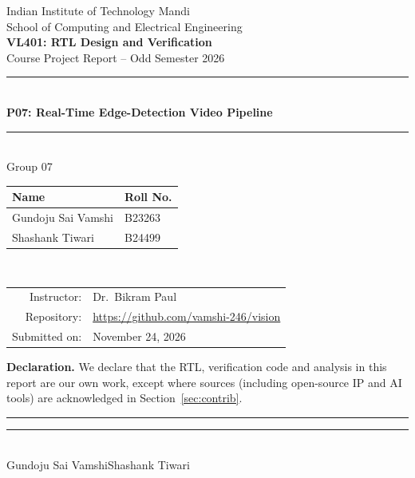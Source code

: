 \documentclass[11pt,a4paper]{article}
\newcommand{\groupno}{07}
\newcommand{\projno}{P07}
\newcommand{\projtitle}{Real-Time Edge-Detection Video Pipeline}
\newcommand{\studentA}{Gundoju Sai Vamshi}
\newcommand{\rollA}{B23263}
\newcommand{\studentB}{Shashank Tiwari}
\newcommand{\rollB}{B24499}
\newcommand{\repourl}{https://github.com/vamshi-246/vision}
\newcommand{\submitdate}{November 24, 2026}
\begin{document}
\begin{titlepage}
\centering
{\large Indian Institute of Technology Mandi}\\[2pt]
{\normalsize School of Computing and Electrical Engineering}\\[1.6cm]
{\Large\bfseries VL401: RTL Design and Verification}\\[4pt]
{\large Course Project Report -- Odd Semester 2026}\\[1.6cm]
{\color{iitblue}\rule{\linewidth}{1pt}}\\[8pt]
{\LARGE\bfseries \projno: \projtitle}\\[8pt]
{\color{iitblue}\rule{\linewidth}{1pt}}\\[1.4cm]
{\large Group \groupno}\\[10pt]
\begin{tabular}{ll}
\toprule
\textbf{Name} & \textbf{Roll No.}\\
\midrule
\studentA & \rollA\\
\studentB & \rollB\\
\bottomrule
\end{tabular}\\[1.2cm]
\begin{tabular}{rl}
Instructor: & Dr.\ Bikram Paul\\
Repository: & \url{\repourl}\\
Submitted on: & \submitdate\\
\end{tabular}
\vfill
\begin{minipage}{0.92\linewidth}\small
\textbf{Declaration.} We declare that the RTL, verification code and analysis in this report are our own
work, except where sources (including open-source IP and AI tools) are acknowledged in
Section~\ref{sec:contrib}.\\[1.0cm]
\rule{5.5cm}{0.4pt}\hfill\rule{5.5cm}{0.4pt}\\
\studentA\hfill\studentB
\end{minipage}
\end{titlepage}
\end{document}
